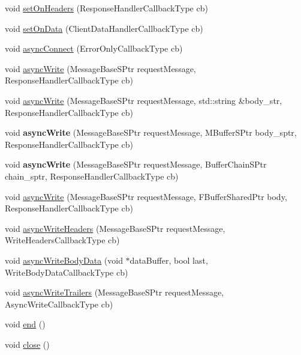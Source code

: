 \begin{DoxyCompactItemize}
\item 
void \hyperlink{class_client_a1d175afa24c28766e3955f7039183b6e}{set\+On\+Headers} (Response\+Handler\+Callback\+Type cb)
\item 
void \hyperlink{class_client_a73e292408e166316e14651941c92f615}{set\+On\+Data} (Client\+Data\+Handler\+Callback\+Type cb)
\item 
void \hyperlink{class_client_a7a272658b966e26a452eeaca461f8fd2}{async\+Connect} (Error\+Only\+Callback\+Type cb)
\item 
void \hyperlink{class_client_a7d9c259aa4e1262987eb3d4e909565e2}{async\+Write} (Message\+Base\+S\+Ptr request\+Message, Response\+Handler\+Callback\+Type cb)
\item 
void \hyperlink{class_client_a4cc4752e98a0466c1dcbfb6791f1e226}{async\+Write} (Message\+Base\+S\+Ptr request\+Message, std\+::string \&body\+\_\+str, Response\+Handler\+Callback\+Type cb)
\item 
\mbox{\label{class_client_ac3481f3e23665c4a4ddabd03eec6575d}} 
void {\bfseries async\+Write} (Message\+Base\+S\+Ptr request\+Message, M\+Buffer\+S\+Ptr body\+\_\+sptr, Response\+Handler\+Callback\+Type cb)
\item 
\mbox{\label{class_client_a7048efd28cbe37f69fc9a607e2d07852}} 
void {\bfseries async\+Write} (Message\+Base\+S\+Ptr request\+Message, Buffer\+Chain\+S\+Ptr chain\+\_\+sptr, Response\+Handler\+Callback\+Type cb)
\item 
void \hyperlink{class_client_aecccd1b8c74dc9c0df4e211a0625391b}{async\+Write} (Message\+Base\+S\+Ptr request\+Message, F\+Buffer\+Shared\+Ptr body, Response\+Handler\+Callback\+Type cb)
\item 
void \hyperlink{class_client_a41a1654e97f9bd05ef1022076be0667c}{async\+Write\+Headers} (Message\+Base\+S\+Ptr request\+Message, Write\+Headers\+Callback\+Type cb)
\item 
void \hyperlink{class_client_a250fc2560b361f3fa3ef4a20061089d9}{async\+Write\+Body\+Data} (void $\ast$data\+Buffer, bool last, Write\+Body\+Data\+Callback\+Type cb)
\item 
void \hyperlink{class_client_ab55418abd09e5c887168d1fdf3bd9d1f}{async\+Write\+Trailers} (Message\+Base\+S\+Ptr request\+Message, Async\+Write\+Callback\+Type cb)
\item 
void \hyperlink{class_client_ae60322d424fa33d49cd88e6bee08e7af}{end} ()
\item 
void \hyperlink{class_client_a2ac4838875e743af25125d8b5c8eba09}{close} ()
\end{DoxyCompactItemize}
